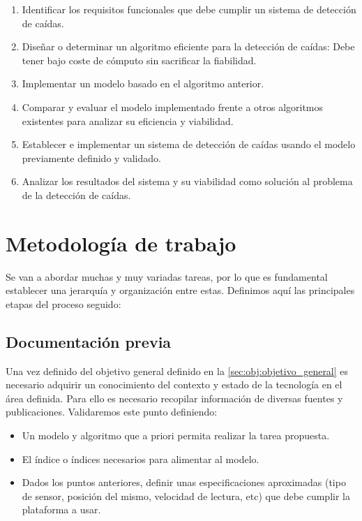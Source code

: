 \begin{enumerate}
  \item Identificar los requisitos funcionales que debe cumplir un sistema de detección de caídas.
  \item Diseñar o determinar un algoritmo eficiente para la detección de caídas: Debe tener bajo coste de cómputo sin sacrificar la fiabilidad.
  \item Implementar un modelo basado en el algoritmo anterior.
  \item Comparar y evaluar el modelo implementado frente a otros algoritmos existentes para analizar su eficiencia y viabilidad.
  \item Establecer e implementar un sistema de detección de caídas usando el modelo previamente definido y validado.
  \item Analizar los resultados del sistema y su viabilidad como solución al problema de la detección de caídas.

\end{enumerate}

\section{Metodología de trabajo}
Se van a abordar muchas y muy variadas tareas, por lo que es fundamental establecer una jerarquía y organización entre estas. Definimos aquí las principales etapas del proceso seguido:

\subsection{Documentación previa}
Una vez definido del objetivo general definido en la \autoref{sec:obj:objetivo_general} es necesario adquirir un conocimiento del contexto y estado de la tecnología en el área definida. Para ello es necesario recopilar información de diversas fuentes y publicaciones. Validaremos este punto definiendo:
\begin{itemize}
  \item Un modelo y algoritmo que a priori permita realizar la tarea propuesta.
  \item El índice o índices necesarios para alimentar al modelo.
  \item Dados los puntos anteriores, definir unas especificaciones aproximadas (tipo de sensor, posición del mismo, velocidad de lectura, etc) que debe cumplir la plataforma a usar.
\end{itemize}

